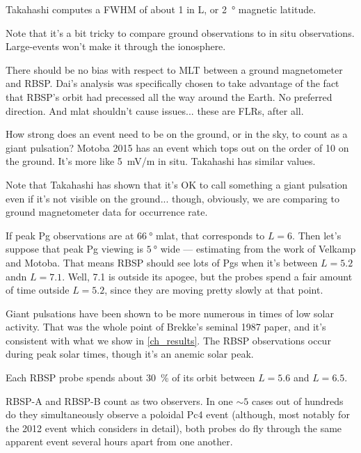 Takahashi\cite{takahashi_2011} computes a FWHM of about 1 in L, or \SI{2}{\degree} magnetic latitude. 


Note that it's a bit tricky to compare ground observations to in situ observations. Large-\azm events won't make it through the ionosphere. 

There should be no bias with respect to MLT between a ground magnetometer and RBSP. Dai's analysis was specifically chosen to take advantage of the fact that RBSP's orbit had precessed all the way around the Earth. No preferred direction. And mlat shouldn't cause issues... these are FLRs, after all. 

How strong does an event need to be on the ground, or in the sky, to count as a giant pulsation? Motoba 2015\cite{motoba_2015} has an event which tops out on the order of \SI{10}{\nT} on the ground. It's more like \SI{5}{\mV/\m} in situ. Takahashi\cite{takahashi_2011} has similar values. 

Note that Takahashi\cite{takahashi_2013} has shown that it's OK to call something a giant pulsation even if it's not visible on the ground... though, obviously, we are comparing to ground magnetometer data for occurrence rate. 

If peak Pg observations are at $\SI{66}{\degree}$ mlat, that corresponds to $L = 6$. Then let's suppose that peak Pg viewing is $\SI{5}{\degree}$ wide --- estimating from the work of Velkamp and Motoba. That means RBSP should see lots of Pgs when it's between $L = 5.2$ andn $L = 7.1$. Well, \SI{7.1}{\RE} is outside its apogee, but the probes spend a fair amount of time outside $L = 5.2$, since they are moving pretty slowly at that point. 

Giant pulsations have been shown to be more numerous in times of low solar activity. That was the whole point of Brekke's seminal 1987 paper, and it's consistent with what we show in \cref{ch_results}. The RBSP observations occur during peak solar times, though it's an anemic solar peak\cite{pesnell_2016}. 


Each RBSP probe spends about \SI{30}{\percent} of its orbit between $L = 5.6$ and $L = 6.5$. 

RBSP-A and RBSP-B count as two observers. In one $\sim 5$ cases out of hundreds do they simultaneously observe a poloidal Pc4 event (although, most notably for the 2012 event which \cite{dai_2013} considers in detail), both probes do fly through the same apparent event several hours apart from one another. 

